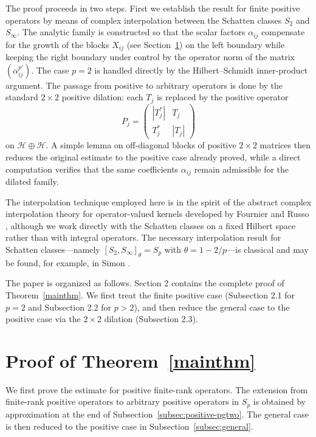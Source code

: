 \documentclass[11pt]{article}
\theoremstyle{definition}
\newcommand{\1}{\mathbf{1}}
\begin{document}
The proof proceeds in two steps. First we establish the result for finite positive operators by means of complex interpolation between the Schatten classes $S_2$ and $S_\infty$. The analytic family is constructed so that the scalar factors $\alpha_{ij}$ compensate for the growth of the blocks $X_{ij}$ (see Section~\ref{compli}) on the left boundary while keeping the right boundary under control by the operator norm of the matrix $(\alpha_{ij}^{p'})$. The case $p=2$ is handled directly by the Hilbert--Schmidt inner-product argument. The passage from positive to arbitrary operators is done by the standard $2\times 2$ positive dilation: each $T_j$ is replaced by the positive operator
\[
P_j=\begin{pmatrix}|T_j^*|&T_j\\T_j^*&|T_j|\end{pmatrix}
\]
on $\mathcal{H}\oplus\mathcal{H}$. A simple lemma on off-diagonal blocks of positive $2\times 2$ matrices then reduces the original estimate to the positive case already proved, while a direct computation verifies that the same coefficients $\alpha_{ij}$ remain admissible for the dilated family.

The interpolation technique employed here is in the spirit of the abstract complex interpolation theory for operator-valued kernels developed by Fournier and Russo \cite{FournierRusso1977}, although we work directly with the Schatten classes on a fixed Hilbert space rather than with integral operators. The necessary interpolation result for Schatten classes---namely $[S_2,S_\infty]_\theta=S_p$ with $\theta=1-2/p$---is classical and may be found, for example, in Simon \cite{SimonTraceIdeals}. 

The paper is organized as follows. Section 2 contains the complete proof of Theorem~\ref{mainthm}. We first treat the finite positive case (Subsection 2.1 for $p=2$ and Subsection 2.2 for $p>2$), and then reduce the general case to the positive case via the $2\times 2$ dilation (Subsection 2.3).

\section{Proof of Theorem~\ref{mainthm}}\label{compli}

We first prove the estimate for positive finite-rank operators. The extension
from finite-rank positive operators to arbitrary positive operators in $S_p$
is obtained by approximation at the end of Subsection~\ref{subsec:positive-pgtwo}.
The general case is then reduced to the positive
case in Subsection~\ref{subsec:general}.
\end{document}
